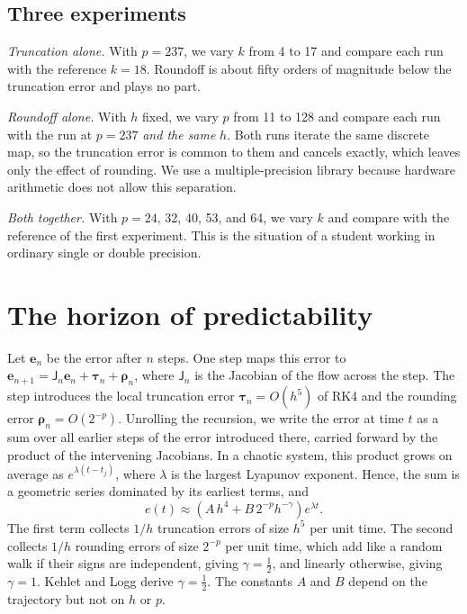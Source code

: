 \documentclass[prb,reprint,amsmath,amssymb,longbibliography]{revtex4-1}
\begin{document}
\subsection{Three experiments}

\emph{Truncation alone.} With $p=237$, we vary $k$ from 4 to 17 and compare each
run with the reference $k=18$. Roundoff is about fifty orders of magnitude below
the truncation error and plays no part.

\emph{Roundoff alone.} With $h$ fixed, we vary $p$ from 11 to 128 and compare
each run with the run at $p=237$ \emph{and the same} $h$. Both runs iterate the
same discrete map, so the truncation error is common to them and cancels
exactly, which leaves only the effect of rounding. We use a multiple-precision
library because hardware arithmetic does not allow this separation.

\emph{Both together.} With $p=24$, 32, 40, 53, and 64, we vary $k$ and compare
with the reference of the first experiment. This is the situation of a student
working in ordinary single or double precision.

\section{The horizon of predictability}
\label{sec:theory}

Let $\bm e_n$ be the error after $n$ steps. One step maps this error to
$\bm e_{n+1}=\mathsf J_n\bm e_n+\bm\tau_n+\bm\rho_n$, where $\mathsf J_n$ is the
Jacobian of the flow across the step. The step introduces the local truncation
error $\bm\tau_n=O(h^5)$ of RK4 and the rounding error $\bm\rho_n=O(2^{-p})$.
Unrolling the recursion, we write the error at time $t$ as a sum over all
earlier steps of the error introduced there, carried forward by the product of
the intervening Jacobians. In a chaotic system, this product grows on average
as $e^{\lambda(t-t_j)}$, where $\lambda$ is the largest Lyapunov exponent.
Hence, the sum is a geometric series dominated by its earliest terms, and
\begin{equation}
e(t)\approx\left(A\,h^{4}+B\,2^{-p}h^{-\gamma}\right)e^{\lambda t}.
\label{eq:error}
\end{equation}
The first term collects $1/h$ truncation errors of size $h^5$ per unit time. The
second collects $1/h$ rounding errors of size $2^{-p}$ per unit time, which add
like a random walk if their signs are independent, giving $\gamma=\tfrac12$, and
linearly otherwise, giving $\gamma=1$.\cite{hairer2008} Kehlet and
Logg\cite{kehlet2017} derive $\gamma=\tfrac12$. The constants $A$ and
$B$ depend on the trajectory but not on $h$ or $p$.
\end{document}
